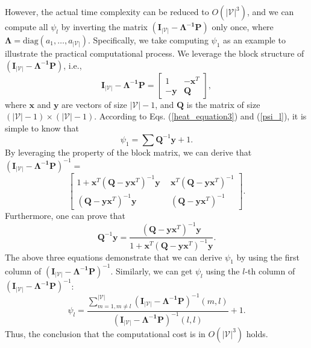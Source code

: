 \documentclass[journal]{IEEEtran}
\begin{document}
However, the actual time complexity can be reduced to $O(|\mathcal {V}|^3)$,
and we can compute all $\psi_l$ by inverting the matrix  $(\boldsymbol{I}_{|\mathcal {V}|}-\boldsymbol{\Lambda^{-1} P})$ only once, where $\boldsymbol{\Lambda} = \text{diag}(a_1,\ldots,  a_{|\mathcal {V}|})$.
Specifically, we take computing $\psi_{1}$ as an example to illustrate the practical computational process.
We leverage the block structure of $(\boldsymbol{I}_{|\mathcal {V}|}-\boldsymbol{\Lambda^{-1} P})$, i.e.,
\begin{equation}
\boldsymbol{I}_{|\mathcal {V}|}-\boldsymbol{\Lambda^{-1} P} =
{\left[ \begin{array}{cc}
1 & -\boldsymbol{x}^{T}\\
-\boldsymbol{y} & \boldsymbol{Q}
\end{array}
\right]},
\end{equation}
where $\boldsymbol{x}$ and $\boldsymbol{y}$ are vectors of size $|\mathcal {V}|-1$, and $\boldsymbol{Q}$ is the matrix of size
$(|\mathcal {V}|-1)\times (|\mathcal {V}|-1)$. According to Eqs. (\ref{heat_equation3}) and (\ref{psi_l}),
it is simple to know that
\begin{equation}
\psi_1 = \sum\boldsymbol{Q}^{-1}\boldsymbol{y} +1.
\end{equation}
By leveraging the property of the block matrix, we can derive that  $(\boldsymbol{I}_{|\mathcal {V}|}-\boldsymbol{\Lambda^{-1} P})^{-1} =$
\begin{equation}{\left[ \begin{array}{cc}
1+\boldsymbol{x}^{T}(\boldsymbol{Q}-\boldsymbol{yx}^{T})^{-1}\boldsymbol{y}~&~ \boldsymbol{x}^{T}(\boldsymbol{Q}-\boldsymbol{yx}^{T})^{-1}\\
(\boldsymbol{Q}-\boldsymbol{yx}^{T})^{-1}\boldsymbol{y} ~&~ (\boldsymbol{Q}-\boldsymbol{yx}^{T})^{-1}
\end{array}
\right]}.
\end{equation}
Furthermore, one can prove that
\begin{equation}
\boldsymbol{Q}^{-1}\boldsymbol{y} = \frac{(\boldsymbol{Q}-\boldsymbol{yx}^{T})^{-1}\boldsymbol{y}}{1+\boldsymbol{x}^{T}(\boldsymbol{Q}-\boldsymbol{yx}^{T})^{-1}\boldsymbol{y}}.
\end{equation}
The above three equations
demonstrate that we can derive $\psi_1$ by using the first column of $(\boldsymbol{I}_{|\mathcal {V}|}-\boldsymbol{\Lambda^{-1} P})^{-1}$.
Similarly, we can get $\psi_l$ using the $l$-th column of $(\boldsymbol{I}_{|\mathcal {V}|}-\boldsymbol{\Lambda^{-1} P})^{-1}$:
\begin{equation}
\psi_l = \frac{\sum_{m=1,m\neq l}^{|\mathcal {V}|}(\boldsymbol{I}_{|\mathcal {V}|}-\boldsymbol{\Lambda^{-1} P})^{-1}(m,l)}{(\boldsymbol{I}_{|\mathcal {V}|}-\boldsymbol{\Lambda^{-1} P})^{-1}(l,l)}+1.
\end{equation}
Thus, the conclusion that the computational cost is in $O(|\mathcal {V}|^3)$ holds.
\end{document}
